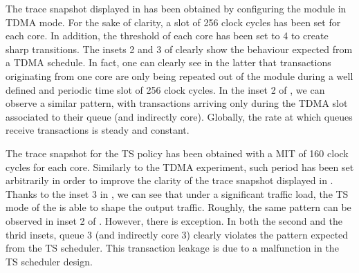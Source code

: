 The trace snapshot displayed in  has
been obtained by configuring the \schim module in TDMA mode. For the
sake of clarity, a slot of 256 clock cycles has been set for each
core. In addition, the threshold of each core has been set to 4 to
create sharp transitions.  The insets 2 and 3 of
 clearly show the behaviour expected
from a TDMA schedule. In fact, one can clearly see in the latter that
transactions originating from one core are only being repeated out of
the \schim module during a well defined and periodic time slot of 256 clock cycles. In the inset 2 of , we can
observe a similar pattern, with transactions arriving only during the
TDMA slot associated to their queue (and indirectly core). Globally,
the rate at which queues receive transactions is steady and constant.

The trace snapshot for the TS policy has been obtained with a MIT of
160 clock cycles for each core. Similarly to the TDMA experiment, such
period has been set arbitrarily in order to improve the clarity of the
trace snapshot displayed in . Thanks to
the inset 3 in , we can see that under a significant traffic load, the TS mode of the \schim is able to shape
the output traffic. Roughly, the same pattern can be observed in inset
2 of . However, there is exception.
In both the second and the thrid insets, queue 3 (and indirectly core 3)
clearly violates the pattern expected from the TS scheduler. This transaction
leakage is due to a malfunction in the TS scheduler design.


